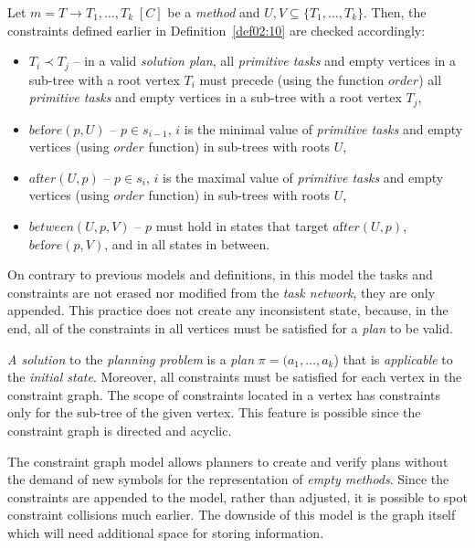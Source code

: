 \medskip\noindent
Let $m = T \rightarrow T_1, \dots, T_k \; [C]$ be a \emph{method} and $U,V \subseteq \{ T_1, \dots, T_k \}$. Then, the constraints defined earlier in Definition~\ref{def02:10} are checked accordingly:

\begin{itemize}
    \item $T_i \prec T_j$ – in a valid \emph{solution plan}, all \emph{primitive tasks} and empty vertices in a sub-tree with a root vertex $T_i$ must precede (using the function $order$) all \emph{primitive tasks} and empty vertices in a sub-tree with a root vertex $T_j$,

    \item $be\text{f}ore(p, U)$ – $p \in s_{i-1}$, $i$ is the minimal value of \emph{primitive tasks} and empty vertices (using $order$ function) in sub-trees with roots $U$,

    \item $a\text{f}ter(U, p)$ – $p \in s_i$, $i$ is the maximal value of \emph{primitive tasks} and empty vertices (using $order$ function) in sub-trees with roots $U$,

    \item $between(U, p, V)$ – $p$ must hold in states that target $a\text{f}ter(U, p)$, $be\text{f}ore(p, V)$, and in all states in between.
\end{itemize}

\medskip\noindent
On contrary to previous models and definitions, in this model the tasks and constraints are not erased nor modified from the \emph{task network}, they are only appended. This practice does not create any inconsistent state, because, in the end, all of the constraints in all vertices must be satisfied for a \emph{plan} to be valid. 

\medskip\noindent
\emph{A solution} to the \emph{planning problem} is a \emph{plan} $\pi = (a_1, \dots, a_k$) that is \emph{applicable} to the \emph{initial state}. Moreover, all constraints must be satisfied for each vertex in the constraint graph. The scope of constraints located in a vertex has constraints only for the sub-tree of the given vertex. This feature is possible since the constraint graph is directed and acyclic.

\medskip\noindent
The constraint graph model allows planners to create and verify plans without the demand of new symbols for the representation of \emph{empty methods}. Since the constraints are appended to the model, rather than adjusted, it is possible to spot constraint collisions much earlier. The downside of this model is the graph itself which will need additional space for storing information.

